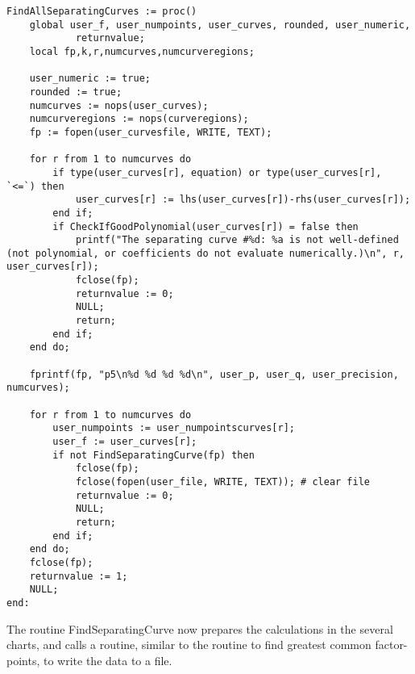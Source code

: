 \documentclass[a4paper,10pt]{article}
\begin{document}
\begin{lstlisting}[name=separatingcurves]
FindAllSeparatingCurves := proc()
    global user_f, user_numpoints, user_curves, rounded, user_numeric,
            returnvalue;
    local fp,k,r,numcurves,numcurveregions;

    user_numeric := true;
    rounded := true;
    numcurves := nops(user_curves);
    numcurveregions := nops(curveregions);
    fp := fopen(user_curvesfile, WRITE, TEXT);

    for r from 1 to numcurves do
        if type(user_curves[r], equation) or type(user_curves[r], `<=`) then
            user_curves[r] := lhs(user_curves[r])-rhs(user_curves[r]);
        end if;
        if CheckIfGoodPolynomial(user_curves[r]) = false then
            printf("The separating curve #%d: %a is not well-defined (not polynomial, or coefficients do not evaluate numerically.)\n", r, user_curves[r]);
            fclose(fp);
            returnvalue := 0;
            NULL;
            return;
        end if;
    end do;

    fprintf(fp, "p5\n%d %d %d %d\n", user_p, user_q, user_precision, numcurves);

    for r from 1 to numcurves do
        user_numpoints := user_numpointscurves[r];
        user_f := user_curves[r];
        if not FindSeparatingCurve(fp) then
            fclose(fp);
            fclose(fopen(user_file, WRITE, TEXT)); # clear file
            returnvalue := 0;
            NULL;
            return;
        end if;
    end do;
    fclose(fp);
    returnvalue := 1;
    NULL;
end:
\end{lstlisting}

The routine FindSeparatingCurve now prepares the calculations in the several
charts, and calls a routine, similar to the routine to find greatest common
factor-points, to write the data to a file.
\end{document}
